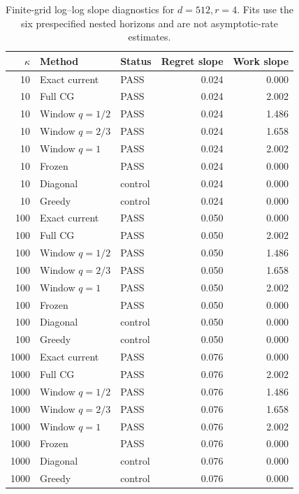 \begin{table}[p]
\centering\scriptsize
\begin{tabular}{rllrr}
\toprule
$\kappa$ & Method & Status & Regret slope & Work slope \\
\midrule
10 & Exact current & PASS & 0.024 & 0.000 \\
10 & Full CG & PASS & 0.024 & 2.002 \\
10 & Window $q=1/2$ & PASS & 0.024 & 1.486 \\
10 & Window $q=2/3$ & PASS & 0.024 & 1.658 \\
10 & Window $q=1$ & PASS & 0.024 & 2.002 \\
10 & Frozen & PASS & 0.024 & 0.000 \\
10 & Diagonal & control & 0.024 & 0.000 \\
10 & Greedy & control & 0.024 & 0.000 \\
100 & Exact current & PASS & 0.050 & 0.000 \\
100 & Full CG & PASS & 0.050 & 2.002 \\
100 & Window $q=1/2$ & PASS & 0.050 & 1.486 \\
100 & Window $q=2/3$ & PASS & 0.050 & 1.658 \\
100 & Window $q=1$ & PASS & 0.050 & 2.002 \\
100 & Frozen & PASS & 0.050 & 0.000 \\
100 & Diagonal & control & 0.050 & 0.000 \\
100 & Greedy & control & 0.050 & 0.000 \\
1000 & Exact current & PASS & 0.076 & 0.000 \\
1000 & Full CG & PASS & 0.076 & 2.002 \\
1000 & Window $q=1/2$ & PASS & 0.076 & 1.486 \\
1000 & Window $q=2/3$ & PASS & 0.076 & 1.658 \\
1000 & Window $q=1$ & PASS & 0.076 & 2.002 \\
1000 & Frozen & PASS & 0.076 & 0.000 \\
1000 & Diagonal & control & 0.076 & 0.000 \\
1000 & Greedy & control & 0.076 & 0.000 \\
\bottomrule
\end{tabular}
\caption{Finite-grid log--log slope diagnostics for $d=512,r=4$.  Fits use the six prespecified nested horizons and are not asymptotic-rate estimates.}
\label{tab:certified-scaling-fits-4}
\end{table}

